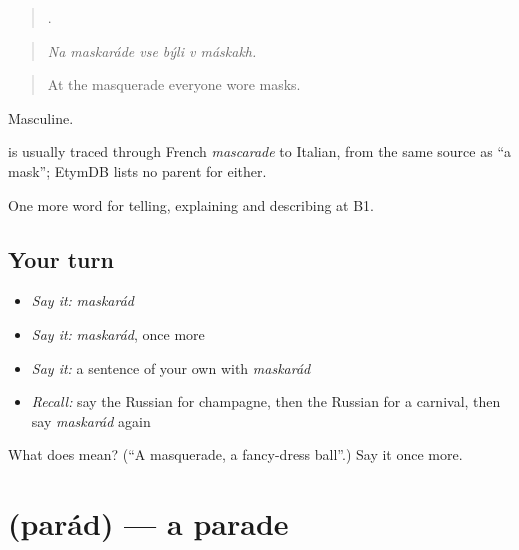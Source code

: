 \begin{quote}
     .
\end{quote}

\begin{quote}
\emph{Na maskaráde vse býli v máskakh.}
\end{quote}

\begin{quote}
At the masquerade everyone wore masks.
\end{quote}

Masculine.

\begin{cousinweb}
\emph{} is usually traced through French \emph{mascarade} to Italian, from the same source as \emph{} \textquotedblleft{}a mask\textquotedblright{}; EtymDB lists no parent for either.
\end{cousinweb}

\begin{grammarlens}[title={What you've built}]
One more word for telling, explaining and describing at B1.
\end{grammarlens}

\subsection*{Your turn}
\begin{itemize}
\raggedright
  \item \emph{Say it:} \emph{maskarád}
  \item \emph{Say it:} \emph{maskarád}, once more
  \item \emph{Say it:} a sentence of your own with \emph{maskarád}
  \item \emph{Recall:} say the Russian for champagne, then the Russian for a carnival, then say \emph{maskarád} again
\end{itemize}

\begin{tcolorbox}[breakable,colback=teal!4,colframe=teal!35!black,title={Before you move on}]
What does  mean? (\textquotedblleft{}A masquerade, a fancy-dress ball\textquotedblright{}.) Say it once more.
\end{tcolorbox}
\section[\texorpdfstring{\ru{парад} (parád)}{парад (parád)}]{ (parád) — a parade}

